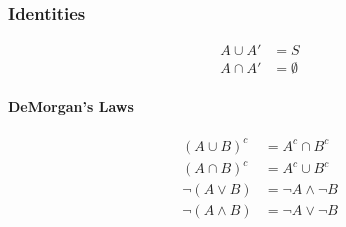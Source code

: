 \hrulefill

\subsubsection*{Identities}

\begin{align*}
    A \cup A' &= S\\
    A \cap A' &= \emptyset
\end{align*}

\paragraph{DeMorgan's Laws}
\begin{align*}
    (A \cup B)^c &= A^c \cap B^c\\
    (A \cap B)^c &= A^c \cup B^c\\
    \neg(A \lor B) &= \neg A \land \neg B\\
    \neg(A \land B) &= \neg A \lor \neg B
\end{align*}


